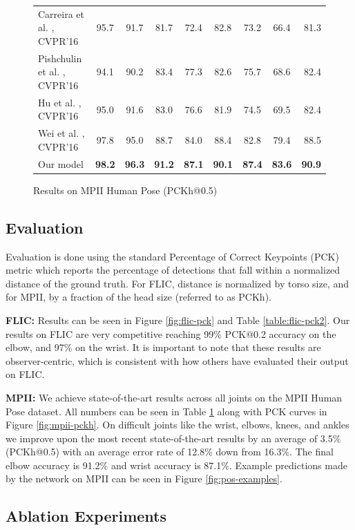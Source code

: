 \documentclass[runningheads]{llncs}
\begin{document}
\begin{figure}[t]
{\begin{tabular}{l||*{7}{c}|r}
  Carreira et al. \cite{carreira2015human}, CVPR'16 &95.7 &91.7 &81.7 &72.4 &82.8 &73.2 &66.4 &81.3\\
  Pishchulin et al. \cite{pish15deepcut}, CVPR'16 &94.1 &90.2 &83.4 &77.3 &82.6 &75.7 & 68.6 & 82.4 \\
  Hu et al. \cite{hu2016bottomup}, CVPR'16 &95.0 &91.6 &83.0 &76.6 &81.9 &74.5 &69.5 &82.4 \\
  Wei et al. \cite{wei2016machines}, CVPR'16 &97.8 &95.0 &88.7 &84.0 &88.4 &82.8 &79.4 &88.5 \\ \hline
  Our model& \textbf{98.2} &\textbf{96.3} &\textbf{91.2} &\textbf{87.1}
           & \textbf{90.1} &\textbf{87.4} & \textbf{83.6} & \textbf{90.9} \\ \hline 
\end{tabular}
}{\caption{Results on MPII Human Pose (PCKh@0.5)}
\label{table:mpii-pckh5}}
\end{figure}

\subsection{Evaluation}

Evaluation is done using the standard Percentage of Correct Keypoints
(PCK) metric which reports the percentage of detections that fall
within a normalized distance of the ground truth. For FLIC, distance
is normalized by torso size, and for MPII, by a fraction of the head
size (referred to as PCKh).

\textbf{FLIC:} Results can be seen in Figure \ref{fig:flic-pck} and
Table \ref{table:flic-pck2}.  Our results on FLIC are very competitive
reaching 99\% PCK@0.2 accuracy on the elbow, and 97\% on the wrist. It
is important to note that these results are observer-centric, which is
consistent with how others have evaluated their output on
FLIC.

\textbf{MPII:} We achieve state-of-the-art results across all joints
on the MPII Human Pose dataset. All numbers can be seen in Table
\ref{table:mpii-pckh5} along with PCK curves in Figure
\ref{fig:mpii-pckh}. On difficult joints like the wrist, elbows,
knees, and ankles we improve upon the most recent state-of-the-art
results by an average of 3.5\% (PCKh@0.5) with an average error rate
of 12.8\% down from 16.3\%. The final elbow accuracy is 91.2\% and
wrist accuracy is 87.1\%. Example predictions made by the network on
MPII can be seen in Figure \ref{fig:pos-examples}.

\subsection{Ablation Experiments}
\end{document}
